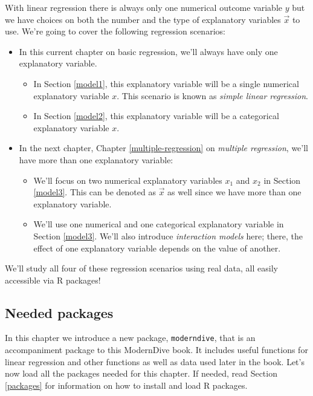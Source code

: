 \documentclass[12pt,]{krantz}
\providecommand{\tightlist}{%
  \setlength{\itemsep}{0pt}\setlength{\parskip}{0pt}}
\theoremstyle{definition}
\theoremstyle{definition}
\theoremstyle{definition}
\theoremstyle{remark}
\begin{document}
With linear regression there is always only one numerical outcome
variable \(y\) but we have choices on both the number and the type of
explanatory variables \(\vec{x}\) to use. We're going to cover the
following regression scenarios:

\begin{itemize}
\tightlist
\item
  In this current chapter on basic regression, we'll always have only
  one explanatory variable.

  \begin{itemize}
  \tightlist
  \item
    In Section \ref{model1}, this explanatory variable will be a single
    numerical explanatory variable \(x\). This scenario is known as
    \emph{simple linear regression}.
  \item
    In Section \ref{model2}, this explanatory variable will be a
    categorical explanatory variable \(x\).
  \end{itemize}
\item
  In the next chapter, Chapter \ref{multiple-regression} on
  \emph{multiple regression}, we'll have more than one explanatory
  variable:

  \begin{itemize}
  \tightlist
  \item
    We'll focus on two numerical explanatory variables \(x_1\) and
    \(x_2\) in Section \ref{model3}. This can be denoted as \(\vec{x}\)
    as well since we have more than one explanatory variable.
  \item
    We'll use one numerical and one categorical explanatory variable in
    Section \ref{model3}. We'll also introduce \emph{interaction models}
    here; there, the effect of one explanatory variable depends on the
    value of another.
  \end{itemize}
\end{itemize}

We'll study all four of these regression scenarios using real data, all
easily accessible via R packages!

\subsection*{Needed packages}\label{needed-packages-3}


In this chapter we introduce a new package, \texttt{moderndive}, that is
an accompaniment package to this ModernDive book. It includes useful
functions for linear regression and other functions as well as data used
later in the book. Let's now load all the packages needed for this
chapter. If needed, read Section \ref{packages} for information on how
to install and load R packages.
\end{document}
